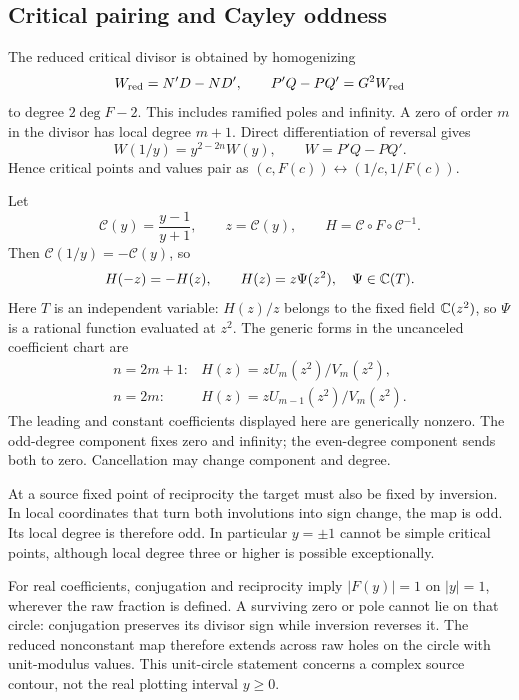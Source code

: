\subsection{Critical pairing and Cayley oddness}
The reduced critical divisor is obtained by homogenizing
\begin{equation}\label{eq:wronskian}
 W_{\rm red}=N'D-ND',\qquad P'Q-PQ'=G^2W_{\rm red}
\end{equation}
to degree \(2\deg F-2\). This includes ramified poles and infinity. A zero of order \(m\) in the divisor has local degree \(m+1\). Direct differentiation of reversal gives
\begin{equation}\label{eq:W_reversal}
 W(1/y)=y^{2-2n}W(y),\qquad W=P'Q-PQ'.
\end{equation}
Hence critical points and values pair as \((c,F(c))\leftrightarrow(1/c,1/F(c))\).

Let
\begin{equation}\label{eq:cayley}
 \mathcal C(y)=\frac{y-1}{y+1},\qquad
 z=\mathcal C(y),\qquad H=\mathcal C\circ F\circ\mathcal C^{-1}.
\end{equation}
Then \(\mathcal C(1/y)=-\mathcal C(y)\), so
\begin{equation}\label{eq:odd}
 H(-z)=-H(z),\qquad H(z)=z\Psi(z^2),\quad \Psi\in\mathbb C(T).
\end{equation}
Here \(T\) is an independent variable: \(H(z)/z\) belongs to the fixed field \(\mathbb C(z^2)\), so \(\Psi\) is a rational function evaluated at \(z^2\). The generic forms in the uncanceled coefficient chart are
\begin{equation}\label{eq:odd_types}
 \begin{array}{ll}
 n=2m+1:& H(z)=zU_m(z^2)/V_m(z^2),\\
 n=2m:& H(z)=zU_{m-1}(z^2)/V_m(z^2).
 \end{array}
\end{equation}
The leading and constant coefficients displayed here are generically nonzero. The odd-degree component fixes zero and infinity; the even-degree component sends both to zero. Cancellation may change component and degree.

At a source fixed point of reciprocity the target must also be fixed by inversion. In local coordinates that turn both involutions into sign change, the map is odd. Its local degree is therefore odd. In particular \(y=\pm1\) cannot be simple critical points, although local degree three or higher is possible exceptionally.

For real coefficients, conjugation and reciprocity imply \(|F(y)|=1\) on \(|y|=1\), wherever the raw fraction is defined. A surviving zero or pole cannot lie on that circle: conjugation preserves its divisor sign while inversion reverses it. The reduced nonconstant map therefore extends across raw holes on the circle with unit-modulus values. This unit-circle statement concerns a complex source contour, not the real plotting interval \(y\ge0\).
